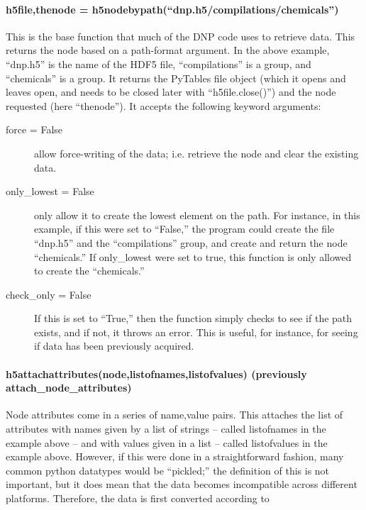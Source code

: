 \paragraph{h5file,thenode = h5nodebypath(``dnp.h5/compilations/chemicals'')}
This is the base function that much of the DNP code uses
    to retrieve data.
This returns the node based on a path-format argument.
In the above example, ``dnp.h5'' is the name of the HDF5 file,
    ``compilations'' is a group,
    and ``chemicals'' is a group.
It returns the PyTables file object
    (which it opens and leaves open, and needs to be
    closed later with ``h5file.close()'')
    and the node requested (here ``thenode'').
It accepts the following keyword arguments:
\begin{mykwargs}
    \begin{description}
        \item[force = False] allow force-writing of the data;
            i.e. retrieve the node and clear the existing data.
        \item[only\_lowest = False] only allow it to create the lowest element on the path.
            For instance, in this example, if this were set to ``False,''
            the program could create the file
            ``dnp.h5'' and the ``compilations'' group,
            and create and return the node  ``chemicals.''
            If only\_lowest were set to true,
            this function is only allowed to create the 
            ``chemicals.''
        \item[check\_only = False] If this is set to ``True,'' then
            the function simply checks to see if the path exists,
            and if not, it throws an error.
            This is useful, for instance,
            for seeing if data has been previously acquired.
    \end{description}
\end{mykwargs}
\paragraph{h5attachattributes(node,listofnames,listofvalues) {\tiny (previously attach\_node\_attributes)}}
Node attributes come in a series of name,value pairs.
This attaches the list of attributes with names given by
    a list of strings -- called listofnames in the example above --
    and with values given in a list
    -- called listofvalues in the example above.
However, if this were done in a straightforward fashion,
    many common python datatypes would be ``pickled;''
    the definition of this is not important,
    but it does mean that the data becomes incompatible across
    different platforms.
Therefore, the data is first converted according to 
